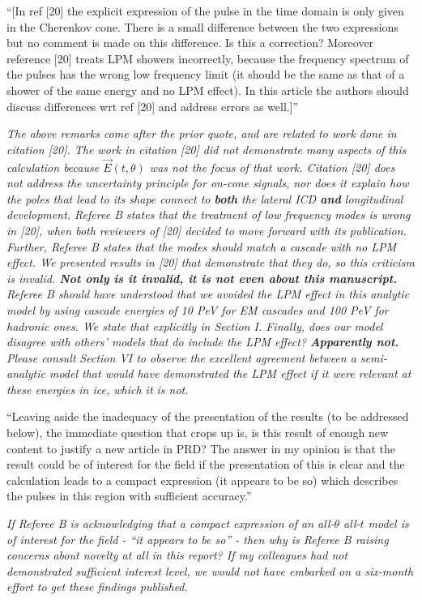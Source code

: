 \documentclass[12pt]{article}
\begin{document}
``[In ref [20] the explicit expression of the pulse in the time domain is only given in the Cherenkov cone. There is a small difference between the two expressions but no comment is made on this difference.  Is this a correction? Moreover reference [20] treats LPM showers incorrectly, because the frequency spectrum of the pulses has the wrong low frequency limit (it should be the same as that of a shower of the same energy and no LPM effect). In this article the authors should discuss differences wrt ref [20] and address errors as well.]''

\textit{The above remarks come after the prior quote, and are related to work done in citation [20].  The work in citation [20] did not demonstrate many aspects of this calculation because $\vec{E}(t,\theta)$ was not the focus of that work.  Citation [20] does not address the uncertainty principle for on-cone signals, nor does it explain how the poles that lead to its shape connect to \textbf{both} the lateral ICD \textbf{and} longitudinal development.  Referee B states that the treatment of low frequency modes is wrong in [20], when both reviewers of [20] decided to move forward with its publication.  Further, Referee B states that the modes should match a cascade with no LPM effect.  We presented results in [20] that demonstrate that they do, so this criticism is invalid.  \textbf{Not only is it invalid, it is not even about this manuscript.}  Referee B should have understood that we avoided the LPM effect in this analytic model by using cascade energies of 10 PeV for EM cascades and 100 PeV for hadronic ones.  We state that explicitly in Section I.  Finally, does our model disagree with others' models that do include the LPM effect? \textbf{Apparently not.}  Please consult Section VI to observe the excellent agreement between a semi-analytic model that would have demonstrated the LPM effect if it were relevant at these energies in ice, which it is not.}

``Leaving aside the inadequacy of the presentation of the results (to be addressed below), the immediate question that crops up is, is this result of enough new content to justify a new article in PRD? The answer in my opinion is that the result could be of interest for the field if the presentation of this is clear and the calculation leads to a compact expression (it appears to be so) which describes the pulses in this region with sufficient accuracy.''

\textit{If Referee B is acknowledging that a compact expression of an all-$\theta$ all-$t$ model is of interest for the field - ``it appears to be so'' - then why is Referee B raising concerns about novelty at all in this report?  If my colleagues had not demonstrated sufficient interest level, we would not have embarked on a six-month effort to get these findings published.}
\end{document}

